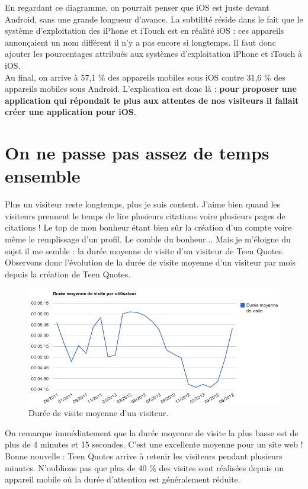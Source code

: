 \documentclass{report}
\begin{document}
	En regardant ce diagramme, on pourrait penser que iOS est juste devant Android, sans une grande longueur d'avance. La subtilité réside dans le fait que le système d'exploitation des iPhone et iTouch est en réalité iOS : ces appareils annonçaient un nom différent il n'y a pas encore si longtemps. Il faut donc ajouter les pourcentages attribués aux systèmes d'exploitation iPhone et iTouch à iOS.\\

	Au final, on arrive à 57,1 \% des appareils mobiles sous iOS contre 31,6 \% des appareils mobiles sous Android. L'explication est donc là : \textbf{pour proposer une application qui répondait le plus aux attentes de nos visiteurs il fallait créer une application pour iOS}.
	\newpage
	\section{On ne passe pas assez de temps ensemble}
	Plus un visiteur reste longtemps, plus je suis content. J'aime bien quand les visiteurs prennent le temps de lire plusieurs citations voire plusieurs pages de citations ! Le top de mon bonheur étant bien sûr la création d'un compte voire même le remplissage d'un profil. Le comble du bonheur... Mais je m'éloigne du sujet il me semble : la durée moyenne de visite d'un visiteur de Teen Quotes.\\

	Observons donc l'évolution de la durée de visite moyenne d'un visiteur par mois depuis la création de Teen Quotes.
	\begin{figure}[H]
		\center
		\includegraphics[width=500px]{images/dureeVisite.png}
		\caption{Durée de visite moyenne d'un visiteur.}
	\end{figure}
	On remarque immédiatement que la durée moyenne de visite la plus basse est de plus de 4 minutes et 15 secondes. C'est une excellente moyenne pour un site web ! Bonne nouvelle : Teen Quotes arrive à retenir les visiteurs pendant plusieurs minutes. N'oublions pas que plus de 40 \% des visites sont réalisées depuis un appareil mobile où la durée d'attention est généralement réduite.\\
\end{document}
